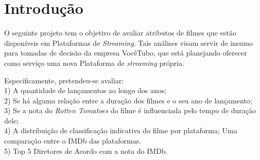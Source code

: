 \documentclass[a4paper, 12pt]{article} %
\begin{document}
\section{Introdução}

O seguinte projeto tem o objetivo de avaliar atributos de filmes que estão disponíveis em Plataformas de \emph{Streaming}. Tais análises visam servir de insumo para tomadas de decisão da empresa VocêTubo, que está planejando oferecer como serviço uma nova Plataforma de \emph{streaming} própria.  

Especificamente, pretendeu-se avaliar:\\
1) A quantidade de lançamentos ao longo dos anos;\\
2) Se há alguma relação entre a duração dos filmes e o seu ano de lançamento;\\
3) Se a nota do \emph{Rotten Tomatoes} do filme é influenciada pelo tempo de duração dele;\\
4) A distribuição de classificação indicativa do filme por plataforma;
Uma comparação entre o IMDb das plataformas.\\
5) Top 5 Diretores de Acordo com a nota do IMDb.\\
\end{document}
